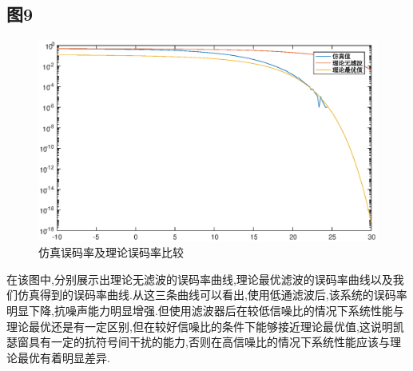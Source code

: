 \documentclass[UTF8]{article}
\begin{document}
\begin{CJK}{UTF8}{gkai}
\subsection{图9}
\begin{figure}[H]
    \centering
    \includegraphics[scale=0.7]{bier.eps}
    \caption{仿真误码率及理论误码率比较}
    \label{blocks}
\end{figure}
在该图中,分别展示出理论无滤波的误码率曲线,理论最优滤波的误码率曲线以及我们仿真得到的误码率曲线.从这三条曲线可以看出,使用低通滤波后,该系统的误码率明显下降,抗噪声能力明显增强.但使用滤波器后在较低信噪比的情况下系统性能与理论最优还是有一定区别,但在较好信噪比的条件下能够接近理论最优值,这说明凯瑟窗具有一定的抗符号间干扰的能力,否则在高信噪比的情况下系统性能应该与理论最优有着明显差异.

\end{CJK}
\end{document}
